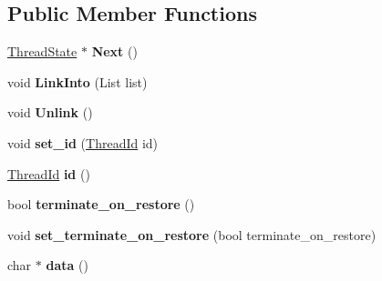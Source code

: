\subsection*{Public Member Functions}
\begin{DoxyCompactItemize}
\item 
\hyperlink{classv8_1_1internal_1_1_thread_state}{Thread\+State} $\ast$ {\bfseries Next} ()\hypertarget{classv8_1_1internal_1_1_thread_state_a72a0930797cee81d1c9554b85d823a85}{}\label{classv8_1_1internal_1_1_thread_state_a72a0930797cee81d1c9554b85d823a85}

\item 
void {\bfseries Link\+Into} (List list)\hypertarget{classv8_1_1internal_1_1_thread_state_a4defafb5b3668efb14f85d77374bbe3b}{}\label{classv8_1_1internal_1_1_thread_state_a4defafb5b3668efb14f85d77374bbe3b}

\item 
void {\bfseries Unlink} ()\hypertarget{classv8_1_1internal_1_1_thread_state_a848a04b06e8f8d3007d96f5c5ef92eca}{}\label{classv8_1_1internal_1_1_thread_state_a848a04b06e8f8d3007d96f5c5ef92eca}

\item 
void {\bfseries set\+\_\+id} (\hyperlink{classv8_1_1internal_1_1_thread_id}{Thread\+Id} id)\hypertarget{classv8_1_1internal_1_1_thread_state_a29a5b54da6f9f06155d8a1c8757ad6f7}{}\label{classv8_1_1internal_1_1_thread_state_a29a5b54da6f9f06155d8a1c8757ad6f7}

\item 
\hyperlink{classv8_1_1internal_1_1_thread_id}{Thread\+Id} {\bfseries id} ()\hypertarget{classv8_1_1internal_1_1_thread_state_a4ea95e4c29e70027b8f5840cc99c38f0}{}\label{classv8_1_1internal_1_1_thread_state_a4ea95e4c29e70027b8f5840cc99c38f0}

\item 
bool {\bfseries terminate\+\_\+on\+\_\+restore} ()\hypertarget{classv8_1_1internal_1_1_thread_state_a67d1acd28377f5beca24b338d5d8936e}{}\label{classv8_1_1internal_1_1_thread_state_a67d1acd28377f5beca24b338d5d8936e}

\item 
void {\bfseries set\+\_\+terminate\+\_\+on\+\_\+restore} (bool terminate\+\_\+on\+\_\+restore)\hypertarget{classv8_1_1internal_1_1_thread_state_a660e8d9c78ff99c0ae245aa2c162851c}{}\label{classv8_1_1internal_1_1_thread_state_a660e8d9c78ff99c0ae245aa2c162851c}

\item 
char $\ast$ {\bfseries data} ()\hypertarget{classv8_1_1internal_1_1_thread_state_a12a9a73b486d3393910b402218a10b0d}{}\label{classv8_1_1internal_1_1_thread_state_a12a9a73b486d3393910b402218a10b0d}

\end{DoxyCompactItemize}
